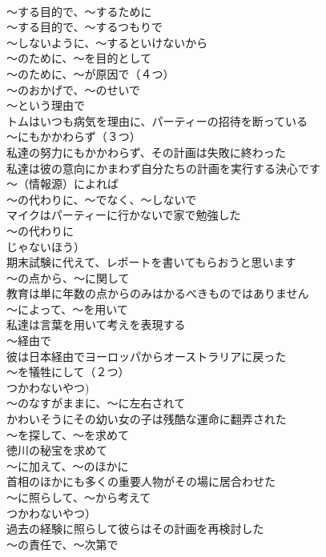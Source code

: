 \documentclass[8pt]{extreport}
\begin{document}
\begin{CJK}{UTF8}{min}
\\	～する目的で、～するために	
\\	～する目的で、～するつもりで	
\\	～しないように、～するといけないから	
\\	～のために、～を目的として	
\\	～のために、～が原因で（４つ）	
\\	～のおかげで、～のせいで	
\\	～という理由で	
\\	トムはいつも病気を理由に、パーティーの招待を断っている
\\	～にもかかわらず（３つ）	
\\	私達の努力にもかかわらず、その計画は失敗に終わった 
\\	私達は彼の意向にかまわず自分たちの計画を実行する決心です
\\	～（情報源）によれば	
\\	～の代わりに、～でなく、～しないで	
\\	マイクはパーティーに行かないで家で勉強した
\\	～の代わりに
\\	じゃないほう）	
\\	期末試験に代えて、レポートを書いてもらおうと思います
\\	～の点から、～に関して	
\\	教育は単に年数の点からのみはかるべきものではありません
\\	～によって、～を用いて	
\\	私達は言葉を用いて考えを表現する
\\	～経由で	
\\	彼は日本経由でヨーロッパからオーストラリアに戻った
\\	～を犠牲にして（２つ）
\\	つかわないやつ)	
\\	～のなすがままに、～に左右されて	
\\	かわいそうにその幼い女の子は残酷な運命に翻弄された
\\	～を探して、～を求めて	
\\	徳川の秘宝を求めて
\\	～に加えて、～のほかに	
\\	首相のほかにも多くの重要人物がその場に居合わせた
\\	～に照らして、～から考えて
\\	つかわないやつ）	
\\	過去の経験に照らして彼らはその計画を再検討した
\\	～の責任で、～次第で	

\end{CJK}
\end{document}
